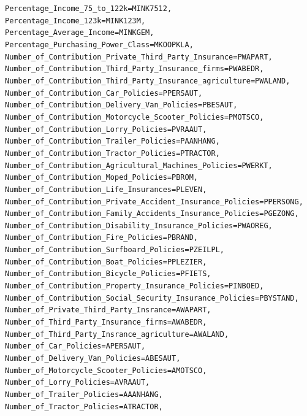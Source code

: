 \documentclass{article}\usepackage[]{graphicx}\usepackage[]{color}
\makeatletter
\newcommand{\hlstd}[1]{\textcolor[rgb]{0.345,0.345,0.345}{#1}}%
\newcommand{\hlkwc}[1]{\textcolor[rgb]{0.333,0.667,0.333}{#1}}%
\newenvironment{kframe}{%
 \def\at@end@of@kframe{}%
 \ifinner\ifhmode%
  \def\at@end@of@kframe{\end{minipage}}%
  \begin{minipage}{\columnwidth}%
 \fi\fi%
 \def\FrameCommand##1{\hskip\@totalleftmargin \hskip-\fboxsep
 \colorbox{shadecolor}{##1}\hskip-\fboxsep
     \hskip-\linewidth \hskip-\@totalleftmargin \hskip\columnwidth}%
 \MakeFramed {\advance\hsize-\width
   \@totalleftmargin\z@ \linewidth\hsize
   \@setminipage}}%
 {\par\unskip\endMakeFramed%
 \at@end@of@kframe}
\newenvironment{knitrout}{}{} %
\makeatother
\begin{document}
\begin{knitrout}
\begin{kframe}
\begin{alltt}
           \hlkwc{Percentage_Income_75_to_122k}\hlstd{=MINK7512,}
           \hlkwc{Percentage_Income_123k}\hlstd{=MINK123M,}
           \hlkwc{Percentage_Average_Income}\hlstd{=MINKGEM,}
           \hlkwc{Percentage_Purchasing_Power_Class}\hlstd{=MKOOPKLA,}
           \hlkwc{Number_of_Contribution_Private_Third_Party_Insurance}\hlstd{=PWAPART,}
           \hlkwc{Number_of_Contribution_Third_Party_Insurance_firms}\hlstd{=PWABEDR,}
           \hlkwc{Number_of_Contribution_Third_Party_Insurance_agriculture}\hlstd{=PWALAND,}
           \hlkwc{Number_of_Contribution_Car_Policies}\hlstd{=PPERSAUT,}
           \hlkwc{Number_of_Contribution_Delivery_Van_Policies}\hlstd{=PBESAUT,}
           \hlkwc{Number_of_Contribution_Motorcycle_Scooter_Policies}\hlstd{=PMOTSCO,}
           \hlkwc{Number_of_Contribution_Lorry_Policies}\hlstd{=PVRAAUT,}
           \hlkwc{Number_of_Contribution_Trailer_Policies}\hlstd{=PAANHANG,}
           \hlkwc{Number_of_Contribution_Tractor_Policies}\hlstd{=PTRACTOR,}
           \hlkwc{Number_of_Contribution_Agricultural_Machines_Policies}\hlstd{=PWERKT,}
           \hlkwc{Number_of_Contribution_Moped_Policies}\hlstd{=PBROM,}
           \hlkwc{Number_of_Contribution_Life_Insurances}\hlstd{=PLEVEN,}
           \hlkwc{Number_of_Contribution_Private_Accident_Insurance_Policies}\hlstd{=PPERSONG,}
           \hlkwc{Number_of_Contribution_Family_Accidents_Insurance_Policies}\hlstd{=PGEZONG,}
           \hlkwc{Number_of_Contribution_Disability_Insurance_Policies}\hlstd{=PWAOREG,}
           \hlkwc{Number_of_Contribution_Fire_Policies}\hlstd{=PBRAND,}
           \hlkwc{Number_of_Contribution_Surfboard_Policies}\hlstd{=PZEILPL,}
           \hlkwc{Number_of_Contribution_Boat_Policies}\hlstd{=PPLEZIER,}
           \hlkwc{Number_of_Contribution_Bicycle_Policies}\hlstd{=PFIETS,}
           \hlkwc{Number_of_Contribution_Property_Insurance_Policies}\hlstd{=PINBOED,}
           \hlkwc{Number_of_Contribution_Social_Security_Insurance_Policies}\hlstd{=PBYSTAND,}
           \hlkwc{Number_of_Private_Third_Party_Insrance}\hlstd{=AWAPART,}
           \hlkwc{Number_of_Third_Party_Insurance_firms}\hlstd{=AWABEDR,}
           \hlkwc{Number_of_Third_Party_Insrance_agriculture}\hlstd{=AWALAND,}
           \hlkwc{Number_of_Car_Policies}\hlstd{=APERSAUT,}
           \hlkwc{Number_of_Delivery_Van_Policies}\hlstd{=ABESAUT,}
           \hlkwc{Number_of_Motorcycle_Scooter_Policies}\hlstd{=AMOTSCO,}
           \hlkwc{Number_of_Lorry_Policies}\hlstd{=AVRAAUT,}
           \hlkwc{Number_of_Trailer_Policies}\hlstd{=AAANHANG,}
           \hlkwc{Number_of_Tractor_Policies}\hlstd{=ATRACTOR,}

\end{alltt}
\end{kframe}
\end{knitrout}
\end{document}
